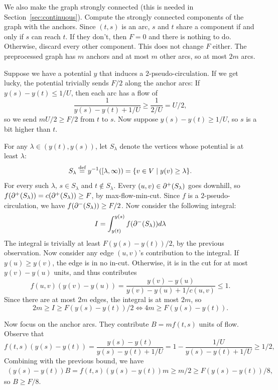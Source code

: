 \documentclass[12 pt]{article}
\begin{document}
We also make the graph strongly connected (this is needed in
Section~\ref{sec:continuous}). Compute the strongly connected components of the
graph with the anchors. Since $(t, s)$ is an arc, $s$ and $t$ share a component
if and only if $s$ can reach $t$. If they don't, then $F = 0$ and there is
nothing to do. Otherwise, discard every other component. This does not change
$F$ either. The preprocessed graph has $m$ anchors and at most $m$ other arcs,
so at most $2m$ arcs.

Suppose we have a potential $y$ that induces a $2$-pseudo-circulation. If we get
lucky, the potential trivially sends $F/2$ along the anchor arcs: If
$y(s) - y(t) \leq 1/U$, then each arc has a flow of
\[
  \frac{1}{y(s) - y(t) + 1/U} \geq \frac{1}{2/U} = U/2,
\]
so we send $mU/2 \geq F/2$ from $t$ to $s$. Now suppose $y(s) - y(t) \geq 1/U$,
so $s$ is a bit higher than $t$.

For any $\lambda \in (y(t), y(s))$, let $S_\lambda$ denote the vertices whose
potential is at least $\lambda$:
\[
  S_\lambda \defeq y^{-1}([\lambda, \infty)) = \Set{v \in V \mid y(v) \geq \lambda}.
\]
For every such $\lambda$, $s \in S_\lambda$ and $t \notin S_\lambda$. Every
$(u, v) \in \outcut{S_\lambda}$ goes downhill, so
$f(\outcut{S_\lambda}) = c(\outcut{S_\lambda}) \geq F$, by max-flow-min-cut.
Since $f$ is a $2$-pseudo-circulation, we have $f(\incut{S_\lambda}) \geq F/2$.
Now consider the following integral:
\[
  I = \int_{y(t)}^{y(s)} f(\incut{S_\lambda})d\lambda
\]
The integral is trivially at least $F(y(s) - y(t))/2$, by the previous
observation. Now consider any edge $(u, v)$'s contribution to the integral. If
$y(u) \geq y(v)$, the edge is in no in-cut. Otherwise, it is in the cut for at
most $y(v) - y(u)$ units, and thus contributes
\[
  f(u, v)(y(v) - y(u)) = \frac{y(v) - y(u)}{y(v) - y(u) + 1/c(u, v)} \leq 1.
\]
Since there are at most $2m$ edges, the integral is at most $2m$, so
\[
  2m \geq I \geq F(y(s) - y(t))/2 \Longleftrightarrow 4m \geq F(y(s) - y(t)).
\]

Now focus on the anchor arcs. They contribute $B = mf(t, s)$ units of flow.
Observe that
\[
  f(t, s)(y(s) - y(t)) =    \frac{y(s) - y(t)}{y(s) - y(t) + 1/U}
                       =    1 - \frac{1/U}{y(s) - y(t) + 1/U}
                       \geq 1/2,
\]
Combining with the previous bound, we have
\begin{align*}
  (y(s) - y(t))B = f(t, s)(y(s) - y(t))m \geq m/2 \geq F(y(s) - y(t))/8,
\end{align*}
so $B \geq F/8$.
\end{document}
